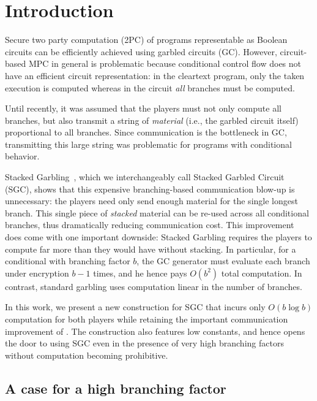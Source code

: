 \section{Introduction}\label{sec:intro}

Secure two party computation (2PC) of programs representable as Boolean circuits can be efficiently achieved using garbled circuits (GC).
%
However,  circuit-based MPC in general is problematic because conditional
control flow does not have an efficient circuit representation:
in the cleartext program, only the taken execution is computed whereas in
the circuit \emph{all} branches must be computed.

%
Until recently, it was assumed that the players must not only compute
all branches, but also transmit a string of \emph{material} (i.e., the garbled circuit itself) 
proportional to all branches.  
Since communication is the bottleneck in GC, transmitting this large string was
problematic for programs with conditional behavior.

Stacked Garbling~\HK, which we %
interchangeably call Stacked Garbled Circuit (SGC), shows that
this expensive branching-based communication blow-up is unnecessary: the players need only
send enough material for the single longest branch. This single
piece of \emph{stacked} material can be re-used across all conditional branches, thus
dramatically reducing communication cost.
%
This improvement does come with one important downside:
Stacked Garbling requires the players to compute far more than they
would have without stacking.
In particular, for a conditional with branching factor $b$, the \HK GC
generator must evaluate each branch under encryption $b-1$ times, and
he hence pays $O(b^2)$ total computation.
In contrast, standard garbling uses computation linear in the number
of branches.

In this work, we present a new construction for SGC that incurs
only $O(b \log b)$ computation for both players while
retaining the important communication improvement of \HK.
%
The construction also features low constants, and hence opens the door
to using SGC even in the presence of very high branching factors
without computation becoming prohibitive.


\subsection{A case for a high branching factor}
\label{sec:motivationHighB}

